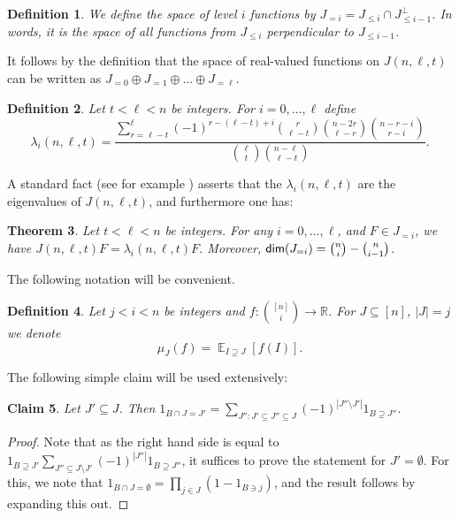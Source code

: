 \documentclass[11pt]{article}
\newtheorem{theorem}{Theorem}[section]
\newtheorem{claim}[theorem]{Claim}
\newtheorem{definition}[theorem]{Definition}
\newcommand\card[1]{\left| {#1} \right|}
\newcommand\Expect[2]{{\mathop{\mathbb{E}}_{#1}\left[ {#2} \right]}}
\newcommand\xor{\oplus}
\renewcommand\leq{\leqslant}
\begin{document}
\begin{definition}
We define the space of level $i$ functions by $J_{=i}=J_{\leq i}\cap J_{\leq i-1}^{\bot}$. In words, it
is the space of all functions from $J_{\leq i}$ perpendicular to $J_{\leq i-1}$.
\end{definition}

It follows by the definition that the space of real-valued functions on $J(n,\ell,t)$ can be written as
$J_{=0}\xor J_{=1}\xor ...\xor J_{=\ell}$.

\begin{definition}
Let $t<\ell<n$ be integers. For $i=0,...,\ell$ define
\[
\lambda_i(n,\ell,t) = \frac{\sum\limits_{r=\ell-t}^{\ell}(-1)^{r-(\ell-t)+i}{r\choose \ell-t}{n-2r\choose \ell-r}{n-r-i \choose r-i}}{{\ell\choose t}{n-\ell \choose \ell-t}}.
\]
%
\end{definition}
A standard fact (see for example \cite[Theorem 6.5.2]{Godsil}) asserts that the $\lambda_i(n,\ell,t)$ are the eigenvalues of $J(n,\ell,t)$, and furthermore one has:
\begin{theorem}\label{thm:eigenvecs}
Let $t<\ell<n$ be integers. For any $i=0,...,\ell$, and $F\in J_{=i}$, we have $J(n,\ell,t) F = \lambda_i(n,\ell,t) F$. Moreover,
${\sf dim}(J_{=i}) = \binom{n}{i}-\binom{n}{i-1}$.
\end{theorem}

The following notation will be convenient.
\begin{definition}
Let $j<i<n$ be integers and $f\colon {[n] \choose i}\to\mathbb{R}$. For $J\subseteq [n]$, $\card{J} = j$ we
denote
\[
\mu_{J}(f) = \Expect{I\supseteq J}{f(I)}.
\]
\end{definition}

The following simple claim will be used extensively:
\begin{claim}\label{claim:expand_out_ex}
  Let $J'\subseteq J$. Then $1_{B\cap J = J'} = \sum\limits_{J'':J'\subseteq J''\subseteq J} (-1)^{\card{J''\setminus J'}} 1_{B\supseteq J''}$.
\end{claim}
\begin{proof}
  Note that as the right hand side is equal to $1_{B\supseteq J'} \sum\limits_{J''\subseteq J\setminus J'} (-1)^{\card{J''}} 1_{B\supseteq J''}$, %
  it suffices to prove the statement for $J'=\emptyset$. For this, we note that $1_{B\cap J = \emptyset} = \prod\limits_{j\in J}\left(1-1_{B\ni j}\right)$,
  and the result follows by expanding this out.
\end{proof}
\end{document}
